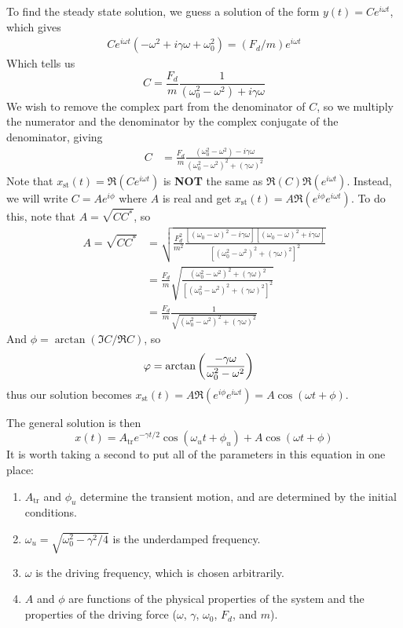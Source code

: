 To find the steady state solution, we guess a solution of the form $y(t) = Ce^{i\omega t}$, which gives
\begin{align*}
    Ce^{i\omega t}(-\omega^2 + i\gamma \omega + \omega_0^2) = (F_d/m)e^{i\omega t}
\end{align*}
Which tells us
\[ C = \frac{F_d}{m}\frac{1}{(\omega_0^2-\omega^2)+i\gamma\omega}\]
We wish to remove the complex part from the denominator of $C$, so we multiply the numerator and the denominator by the complex conjugate of the denominator, giving
\begin{align*}
    C &= \frac{F_d}{m}\frac{(\omega_0^2-\omega^2)-i\gamma\omega}{(\omega_0^2-\omega ^2)^2+(\gamma\omega)^2}
\end{align*}
Note that $x_\text{st}(t) = \Re(Ce^{i\omega t})$ is \textbf{NOT} the same as $\Re(C)\Re(e^{i\omega t})$. Instead, we will write $C = Ae^{i\phi}$ where $A$ is real and get $x_\text{st}(t) = A\Re (e^{i\phi}e^{i\omega t})$. To do this, note that $A = \sqrt{CC^*}$, so
\begin{align*}
    A = \sqrt{CC^*} &= \sqrt{\frac{F_d^2}{m^2}\frac{[(\omega_0-\omega)^2-i\gamma\omega][(\omega_0-\omega)^2+i\gamma\omega]}{[(\omega_0^2-\omega^2)^2+(\gamma\omega)^2]^2}} \\
    &= \frac{F_d}{m}\sqrt{\frac{(\omega_0^2-\omega^2)^2+(\gamma\omega)^2}{[(\omega_0^2-\omega^2)^2+(\gamma\omega)^2]^2}} \\
    &= \frac{F_d}{m} \frac{1}{\sqrt{(\omega_0^2-\omega^2)^2+(\gamma\omega)^2}}
\end{align*}
And $\phi = \arctan(\Im C/\Re C)$, so
\begin{align*}
    \phi &= \arctan\pqty{\frac{-\gamma\omega}{\omega_0^2-\omega^2}}
\end{align*}
thus our solution becomes $x_\text{st}(t) = A\Re(e^{i\phi}e^{i\omega t}) = A\cos(\omega t + \phi)$.

The general solution is then
\begin{equation}
    x(t) = A_\text{tr}e^{-\gamma t/2}\cos(\omega_ut+\phi_u) + A\cos(\omega t+\phi)
\end{equation}
It is worth taking a second to put all of the parameters in this equation in one place:
\begin{enumerate}
    \item $A_\text{tr}$ and $\phi_u$ determine the transient motion, and are determined by the initial conditions.
    \item $\omega_u = \sqrt{\omega_0^2-\gamma^2/4}$ is the underdamped frequency.
    \item $\omega$ is the driving frequency, which is chosen arbitrarily.
    \item $A$ and $\phi$ are functions of the physical properties of the system and the properties of the driving force ($\omega$, $\gamma$, $\omega_0$, $F_d$, and $m$).
\end{enumerate}
